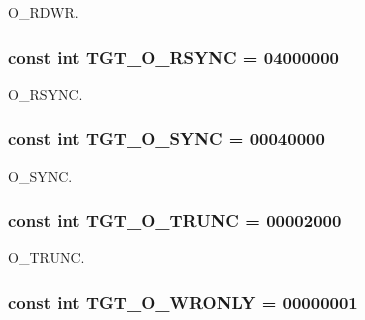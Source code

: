 O\_\-RDWR. \hypertarget{classAlphaLinux_a1b4245158ffbfdc36ae7d6e666ffc261}{
\subsubsection[{TGT\_\-O\_\-RSYNC}]{\setlength{\rightskip}{0pt plus 5cm}const int {\bf TGT\_\-O\_\-RSYNC} = 04000000}}
\label{classAlphaLinux_a1b4245158ffbfdc36ae7d6e666ffc261}


O\_\-RSYNC. \hypertarget{classAlphaLinux_abf43ab05d2a5b6b8113952160d8565db}{
\subsubsection[{TGT\_\-O\_\-SYNC}]{\setlength{\rightskip}{0pt plus 5cm}const int {\bf TGT\_\-O\_\-SYNC} = 00040000}}
\label{classAlphaLinux_abf43ab05d2a5b6b8113952160d8565db}


O\_\-SYNC. \hypertarget{classAlphaLinux_a4f892ee6e1424a2becd859b0bef1f18b}{
\subsubsection[{TGT\_\-O\_\-TRUNC}]{\setlength{\rightskip}{0pt plus 5cm}const int {\bf TGT\_\-O\_\-TRUNC} = 00002000}}
\label{classAlphaLinux_a4f892ee6e1424a2becd859b0bef1f18b}


O\_\-TRUNC. \hypertarget{classAlphaLinux_a6156c069cefe05ce3cce033b2e0c2de2}{
\subsubsection[{TGT\_\-O\_\-WRONLY}]{\setlength{\rightskip}{0pt plus 5cm}const int {\bf TGT\_\-O\_\-WRONLY} = 00000001}}
\label{classAlphaLinux_a6156c069cefe05ce3cce033b2e0c2de2}


